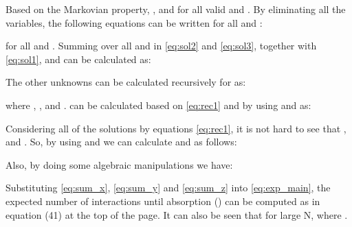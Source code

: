 \documentclass[conference]{IEEEtran}
\theoremstyle{definition}
\theoremstyle{definition}
\begin{document}
Based on the Markovian property, , and  for all valid  and . By eliminating all the  variables, the following equations can be written for all  and :

for all  and . Summing over all  and  in \eqref{eq:sol2} and \eqref{eq:sol3}, together with \eqref{eq:sol1},  and  can be calculated as:

The other unknowns can be calculated recursively for  as:

where , , and .  can be calculated based on \eqref{eq:rec1} and by using  and  as:

Considering all of the solutions by equations \eqref{eq:rec1}, it is not hard to see that , and . So, by using  and  we can calculate  and  as follows:



Also, by doing some algebraic manipulations we have:

Substituting \eqref{eq:sum_x}, \eqref{eq:sum_y} and \eqref{eq:sum_z} into \eqref{eq:exp_main}, the expected number of interactions until absorption () can be computed as in equation (41) at the top of the page. It can also be seen that for large N,  where .

\end{document}
